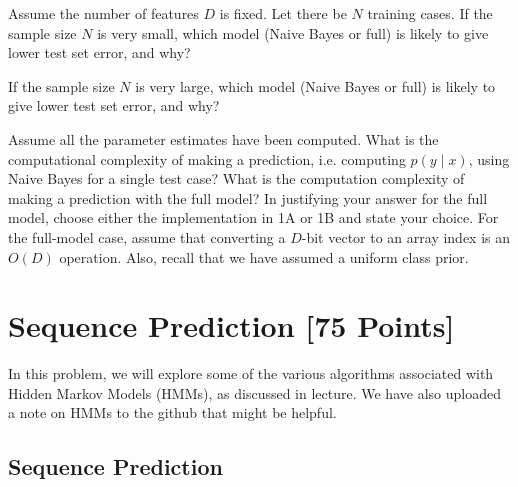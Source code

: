 \begin{solution}
\end{solution}

\problem[4] Assume the number of features $D$ is fixed. Let there be $N$ training cases. If the sample size $N$ is very small, which model (Naive Bayes or full) is likely to give lower test set error, and why?

\begin{solution}
\end{solution}

\problem[4] If the sample size $N$ is very large, which model (Naive Bayes or full) is likely to give lower test set error, and why?
\begin{solution} 
\end{solution}

\problem[8 EC] Assume all the parameter estimates have been computed. What is the computational complexity of making a prediction, i.e. computing $p(y \mid x)$, using Naive Bayes for a single test case? What is the computation complexity of making a prediction with the full model? In justifying your answer for the full model, choose either the implementation in 1A or 1B and state your choice. For the full-model case, assume that converting a $D$-bit vector to an array index is an $O(D)$ operation.  Also, recall that we have assumed a uniform class prior. 

\begin{solution}
\end{solution}


\newpage
\section{Sequence Prediction [75 Points]}

In this problem, we will explore some of the various algorithms associated with Hidden Markov Models (HMMs), as discussed in lecture.
We have also uploaded a note on HMMs to the github that might be helpful.

\subsection{Sequence Prediction}

